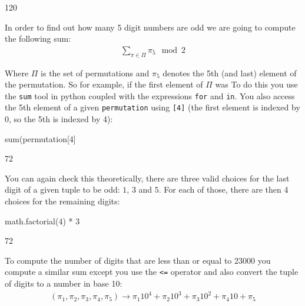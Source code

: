 \begin{raw}
120
\end{raw}





In order to find out how many 5 digit numbers are odd we are going to compute
the following sum:
\begin{equation*}
\begin{split}
    \sum_{\pi \in \Pi} \pi_5 \mod 2
\end{split}
\end{equation*}

Where \(\Pi\) is the set of permutations and \(\pi_5\) denotes the 5th (and last)
element of the permutation. So for example, if the first element of \(\Pi\) was
To do this you use the \texttt{sum} tool in python coupled with the expressions
\texttt{for}
and \texttt{in}. You also access the 5th element of a given \texttt{permutation}
using \texttt{[4]} (the
first element is indexed by 0, so the 5th is indexed by 4):




\begin{pyin}
sum(permutation[4] %
\end{pyin}





\begin{raw}
72
\end{raw}





You can again check this theoretically, there are three valid choices for the
last digit of a given tuple to be odd: \(1\), \(3\) and \(5\). For each of those,
there are then 4 choices for the remaining digits:




\begin{pyin}
math.factorial(4) * 3
\end{pyin}





\begin{raw}
72
\end{raw}





To compute the number of digits that are less than or equal to 23000 you compute a
similar sum except you use the \texttt{<=} operator and also convert the tuple of digits
to a number in base 10:
\begin{equation*}
\begin{split}
    (\pi_1, \pi_2, \pi_3, \pi_4, \pi_5) \to \pi_1 10 ^ 4 + \pi_2 10 ^ 3 + \pi_3 10 ^ 2 + \pi_4 10 + \pi_5
\end{split}
\end{equation*}

